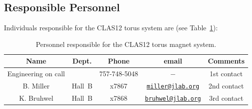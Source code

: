 %
%
%

\subsection{Responsible Personnel}

Individuals responsible for the CLAS12 torus system are (see Table~\ref{tb:torus}):

\begin{table}[!htb]
\centering
\begin{tabular}{|c|c|c|c|c|} \hline
Name       & Dept.  & Phone&email&Comments \\ \hline
Engineering on call &  &757-748-5048&$-$& 1st contact \\ \hline
B. Miller  & Hall~B & x7867&\href{mailto:miller@jlab.org}{\nolinkurl{miller@jlab.org}}&2nd contact\\ \hline
K. Bruhwel & Hall~B & x7868&\href{mailto:}{\nolinkurl{bruhwel@jlab.org}}&3rd contact \\ \hline
\end{tabular}
\caption{Personnel responsible for the CLAS12 torus magnet system.} 
\label{tb:torus}
\end{table}

